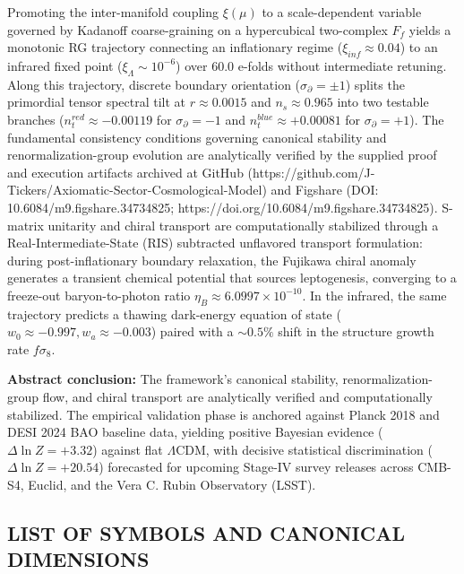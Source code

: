 \documentclass[aps,prd,onecolumn,superscriptaddress,nofootinbib,longbibliography,10pt]{revtex4-2}
\begin{document}
  Promoting the inter-manifold coupling \(\xi(\mu)\) to a scale-dependent variable governed by Kadanoff coarse-graining on a hypercubical two-complex \(F_f\) yields a monotonic RG trajectory connecting an inflationary regime (\(\xi_{inf} \approx 0.04\)) to an infrared fixed point (\(\xi_\Lambda \sim 10^{-6}\)) over 60.0 e-folds without intermediate retuning. Along this trajectory, discrete boundary orientation (\(\sigma_\partial = \pm 1\)) splits the primordial tensor spectral tilt at \(r \approx 0.0015\) and \(n_s \approx 0.965\) into two testable branches (\(n_t^{red} \approx -0.00119\) for \(\sigma_\partial = -1\) and \(n_t^{blue} \approx +0.00081\) for \(\sigma_\partial = +1\)). The fundamental consistency conditions governing canonical stability and renormalization-group evolution are analytically verified by the supplied proof and execution artifacts archived at GitHub (https://github.com/J-Tickers/Axiomatic-Sector-Cosmological-Model) and Figshare (DOI: 10.6084/m9.figshare.34734825; https://doi.org/10.6084/m9.figshare.34734825). S-matrix unitarity and chiral transport are computationally stabilized through a Real-Intermediate-State (RIS) subtracted unflavored transport formulation: during post-inflationary boundary relaxation, the Fujikawa chiral anomaly generates a transient chemical potential that sources leptogenesis, converging to a freeze-out baryon-to-photon ratio \(\eta_B \approx 6.0997 \times 10^{-10}\). In the infrared, the same trajectory predicts a thawing dark-energy equation of state (\(w_0 \approx -0.997, w_a \approx -0.003\)) paired with a \(\sim 0.5\%\) shift in the structure growth rate \(f\sigma_8\).


  \textbf{Abstract conclusion:} The framework's canonical stability, renormalization-group flow, and chiral transport are analytically verified and computationally stabilized. The empirical validation phase is anchored against Planck 2018 and DESI 2024 BAO baseline data, yielding positive Bayesian evidence (\(\Delta \ln Z = +3.32\)) against flat $\Lambda$CDM, with decisive statistical discrimination (\(\Delta \ln Z = +20.54\)) forecasted for upcoming Stage-IV survey releases across CMB-S4, Euclid, and the Vera C. Rubin Observatory (LSST).




 

  
\subsection*{LIST OF SYMBOLS AND CANONICAL DIMENSIONS}
\end{document}
